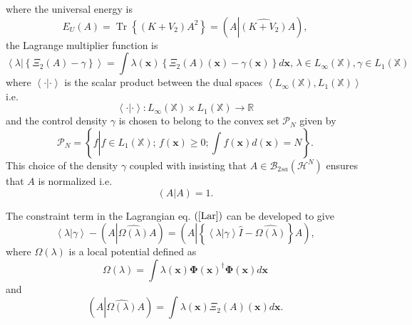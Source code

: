 \documentclass[aps,preprint]{revtex4}%
\begin{document}
where the universal energy is
\begin{equation}
E_{U}\left(  A\right)  =\operatorname{Tr}\left\{  \left(  K+V_{2}\right)
A^{2}\right\}  =\left(  A\left\vert \widehat{\left(  K+V_{2}\right)
}A\right.  \right)  ,
\end{equation}
the Lagrange multiplier function is
\begin{equation}
\left\langle \left.  \lambda\right\vert \left\{  \Xi_{2}\left(  A\right)
-\gamma\right\}  \right\rangle =\int\lambda\left(  \mathbf{x}\right)  \left\{
\Xi_{2}\left(  A\right)  \left(  \mathbf{x}\right)  -\gamma\left(
\mathbf{x}\right)  \right\}  d\mathbf{x,\,}\lambda\in L_{\infty}\left(
\mathbb{X}\right)  ,\gamma\in L_{1}\left(  \mathbb{X}\right)
\end{equation}
where $\left\langle \cdot|\cdot\right\rangle $ is the scalar product between
the dual spaces $\left\langle L_{\infty}\left(  \mathbb{X}\right)
,L_{1}\left(  \mathbb{X}\right)  \right\rangle $ i.e.
\begin{equation}
\left\langle \cdot|\cdot\right\rangle :L_{\infty}\left(  \mathbb{X}\right)
\times L_{1}\left(  \mathbb{X}\right)  \rightarrow\mathbb{R}%
\end{equation}
and the control density $\gamma$ is chosen to belong to the convex set
$\mathcal{P}_{N}$ given by
\begin{equation}
\mathcal{P}_{N}=\left\{  f\left\vert f\in L_{1}\left(  \mathbb{X}\right)
;\,f\left(  \mathbf{x}\right)  \geq0;\int f\left(  \mathbf{x}\right)  d\left(
\mathbf{x}\right)  =N\right.  \right\}  .
\end{equation}
This choice of the density $\gamma$ coupled with insisting that $A\in
\mathcal{B}_{2sa}\left(  \mathcal{H}^{N}\right)  $ ensures that $A$ is
normalized i.e.
\begin{equation}
\left(  A\left\vert A\right.  \right)  =1.
\end{equation}


The constraint term in the Lagrangian eq. $\left(  \ref{Lar}\right)  $ can be
developed to give
\begin{equation}
\left\langle \lambda\left\vert \gamma\right.  \right\rangle -\left(
A\left\vert \widehat{\Omega\left(  \lambda\right)  }\right.  A\right)
=\left(  A\left\vert \left\{  \left\langle \lambda\left\vert \gamma\right.
\right\rangle \hat{I}-\widehat{\Omega\left(  \lambda\right)  }\right\}
\right.  A\right)  ,
\end{equation}
where $\Omega\left(  \lambda\right)  $ is a local potential defined as
\begin{equation}
\Omega\left(  \lambda\right)  =\int\lambda\left(  \mathbf{x}\right)
\mathbf{\Phi}\left(  \mathbf{x}\right)  ^{\dagger}\mathbf{\Phi}\left(
\mathbf{x}\right)  d\mathbf{x}%
\end{equation}
and
\begin{equation}
\left(  A\left\vert \widehat{\Omega\left(  \lambda\right)  }\right.  A\right)
=\int\lambda\left(  \mathbf{x}\right)  \Xi_{2}\left(  A\right)  \left(
\mathbf{x}\right)  d\mathbf{x.}%
\end{equation}
\end{document}
